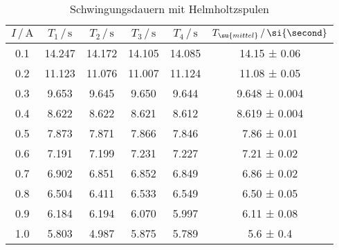 \begin{table}[H]
  \centering
  \begin{tabular}{c| c c c c |c}
    \toprule
    $I\,/\,\si{\ampere}$ & $T_1\,/\,\si{\second}$ & $T_2\,/\,\si{\second}$ & $T_3\,/\,\si{\second}$ & $T_4\,/\,\si{\second}$
    & $T_\su{mittel}\,/\,\si{\second}$\\
    \midrule
    0.1 & 14.247 & 14.172 & 14.105 & 14.085 & 14.15 ± 0.06 \\
    0.2 & 11.123 & 11.076 & 11.007 & 11.124 & 11.08 ± 0.05\\
    0.3 &  9.653 & 9.645 & 9.650 & 9.644 &    9.648 ± 0.004  \\
    0.4 &  8.622 & 8.622 & 8.621 & 8.612 &    8.619 ± 0.004  \\
    0.5 &  7.873 & 7.871 & 7.866 & 7.846 &    7.86 ± 0.01  \\
    0.6 &  7.191 & 7.199 & 7.231 & 7.227 &    7.21 ± 0.02  \\
    0.7 &  6.902 & 6.851 & 6.852 & 6.849 &    6.86 ± 0.02  \\
    0.8 &  6.504 & 6.411 & 6.533 & 6.549 &    6.50 ± 0.05  \\
    0.9 &  6.184 & 6.194 & 6.070 & 5.997 &    6.11 ± 0.08  \\
    1.0 &  5.803 & 4.987 & 5.875 & 5.789 &    5.6  ± 0.4  \\
    \bottomrule
  \end{tabular}
  \caption{Schwingungsdauern mit Helmholtzspulen}
  \label{tab:helm}
\end{table}
